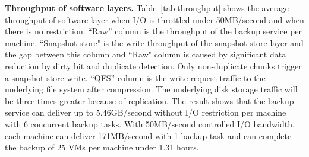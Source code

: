 {\bf Throughput of software layers.}
Table~\ref{tab:throughput} shows the  average throughput of software layer
when I/O is throttled under 50MB/second and when there is no restriction.
``Raw'' column is the throughput  of the backup service  per machine.
``Snapshot store" is the  write throughput of the snapshot store layer and the gap between this
column and  ``Raw" column is caused by significant data reduction by dirty bit and duplicate
detection. Only non-duplicate chunks trigger a snapshot store write.
``QFS'' column is the write request traffic to the underlying file system after compression.
The underlying disk storage traffic will be three times greater because of replication.
The result shows that the backup service can deliver up to 5.46GB/second without I/O restriction
per machine with 6 concurrent backup tasks. With 50MB/second controlled I/O bandwidth, each machine can deliver 171MB/second with 1 backup task and can complete the backup of 25 VMs per machine under 1.31 hours.
 




